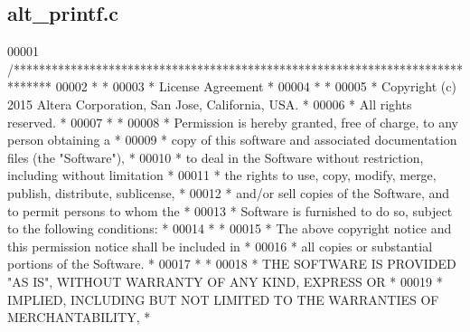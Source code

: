 \subsection{alt\+\_\+printf.\+c}
\label{alt__printf_8c_source}

\begin{DoxyCode}
00001 \textcolor{comment}{/******************************************************************************}
00002 \textcolor{comment}{*                                                                             *}
00003 \textcolor{comment}{* License Agreement                                                           *}
00004 \textcolor{comment}{*                                                                             *}
00005 \textcolor{comment}{* Copyright (c) 2015 Altera Corporation, San Jose, California, USA.           *}
00006 \textcolor{comment}{* All rights reserved.                                                        *}
00007 \textcolor{comment}{*                                                                             *}
00008 \textcolor{comment}{* Permission is hereby granted, free of charge, to any person obtaining a     *}
00009 \textcolor{comment}{* copy of this software and associated documentation files (the "Software"),  *}
00010 \textcolor{comment}{* to deal in the Software without restriction, including without limitation   *}
00011 \textcolor{comment}{* the rights to use, copy, modify, merge, publish, distribute, sublicense,    *}
00012 \textcolor{comment}{* and/or sell copies of the Software, and to permit persons to whom the       *}
00013 \textcolor{comment}{* Software is furnished to do so, subject to the following conditions:        *}
00014 \textcolor{comment}{*                                                                             *}
00015 \textcolor{comment}{* The above copyright notice and this permission notice shall be included in  *}
00016 \textcolor{comment}{* all copies or substantial portions of the Software.                         *}
00017 \textcolor{comment}{*                                                                             *}
00018 \textcolor{comment}{* THE SOFTWARE IS PROVIDED "AS IS", WITHOUT WARRANTY OF ANY KIND, EXPRESS OR  *}
00019 \textcolor{comment}{* IMPLIED, INCLUDING BUT NOT LIMITED TO THE WARRANTIES OF MERCHANTABILITY,    *}

\end{DoxyCode}
